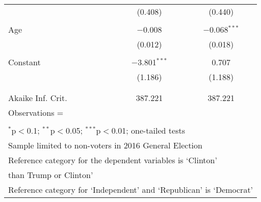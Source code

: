 \documentclass[12pt]{article}
\begin{document}
\begin{appendices}
\begin{refsection}
\begin{table}[!tp]
\begin{adjustbox}{width=0.6\textwidth,center}
\begin{tabular}{@{\extracolsep{5pt}}lcc}
  & (0.408) & (0.440) \\ 
  & & \\ 
 Age & $-$0.008 & $-$0.068$^{***}$ \\ 
  & (0.012) & (0.018) \\ 
  & & \\ 
 Constant & $-$3.801$^{***}$ & 0.707 \\ 
  & (1.186) & (1.188) \\ 
  & & \\ 
\hline \\[-1.8ex] 
Akaike Inf. Crit. & 387.221 & 387.221 \\ 
Observations =  &  &  \\
\hline 
\hline \\[-1.8ex] 
\multicolumn{3}{l}{\footnotesize $^{*}$p$<$0.1; $^{**}$p$<$0.05; $^{***}$p$<$0.01; one-tailed tests} \\ 
\multicolumn{3}{l}{\footnotesize Sample limited to non-voters in 2016 General Election} \\
\multicolumn{3}{l}{\footnotesize Reference category for the dependent variables is `Clinton'} \\
\multicolumn{3}{l}{\footnotesize than Trump or Clinton'} \\
\multicolumn{3}{l}{\footnotesize Reference category for `Independent' and `Republican' is `Democrat'} \\
\end{tabular} 
\end{adjustbox}
\end{table}



\clearpage
\printbibliography
\end{refsection}
\end{appendices}
\end{document}
